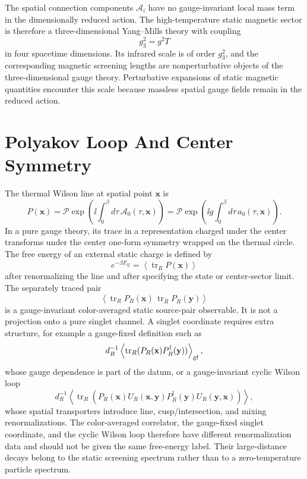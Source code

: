 The spatial connection components \(\mathcal A_i\) have no gauge-invariant
local mass term in the dimensionally reduced action.  The high-temperature
static magnetic sector is therefore a three-dimensional Yang--Mills theory
with coupling
\[
  g_3^2=g^2T
\]
in four spacetime dimensions.  Its infrared scale is of order \(g_3^2\), and
the corresponding magnetic screening lengths are nonperturbative objects of
the three-dimensional gauge theory.  Perturbative expansions of static
magnetic quantities encounter this scale because massless spatial gauge
fields remain in the reduced action.

\section{Polyakov Loop And Center Symmetry}

The thermal Wilson line at spatial point \(\mathbf x\) is
\[
  P(\mathbf x)=
  \mathcal P\exp\!\left(\ii\int_0^\beta d\tau\,
  \mathcal A_0(\tau,\mathbf x)\right)
  =
  \mathcal P\exp\!\left(\ii g\int_0^\beta d\tau\,
  a_0(\tau,\mathbf x)\right).
\]
In a pure gauge theory, its trace in a representation charged under the center
transforms under the center one-form symmetry wrapped on the thermal circle.
The free energy of an external static charge is defined by
\[
  e^{-\beta F_Q}=\left\langle \operatorname{tr}_R P(\mathbf x)\right\rangle
\]
after renormalizing the line and after specifying the state or center-sector
limit.  The separately traced pair
\[
  \left\langle
  \operatorname{tr}_R P_R(\mathbf x)\,
  \operatorname{tr}_{\bar R}P_{\bar R}(\mathbf y)
  \right\rangle
\]
is a gauge-invariant color-averaged static source-pair observable.  It is not
a projection onto a pure singlet channel.  A singlet coordinate requires extra
structure, for example a gauge-fixed definition such as
\[
  d_R^{-1}\left\langle
  \operatorname{tr}_R(P_R(\mathbf x)P_R^\dagger(\mathbf y))
  \right\rangle_{\rm gf},
\]
whose gauge dependence is part of the datum, or a gauge-invariant cyclic
Wilson loop
\[
  d_R^{-1}\left\langle
  \operatorname{tr}_R\!\left(
    P_R(\mathbf x)U_R(\mathbf x,\mathbf y)
    P_R^\dagger(\mathbf y)U_R(\mathbf y,\mathbf x)
  \right)\right\rangle ,
\]
whose spatial transporters introduce line, cusp/intersection, and mixing
renormalizations.  The color-averaged correlator, the gauge-fixed singlet
coordinate, and the cyclic Wilson loop therefore have different
renormalization data and should not be given the same free-energy label.
Their large-distance decays belong to the static screening spectrum rather
than to a zero-temperature particle spectrum.

